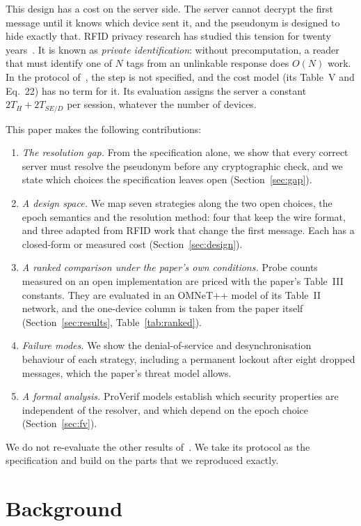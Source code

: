 This design has a cost on the server side. The server cannot decrypt the first message until it knows which device sent
it, and the pseudonym is designed to hide exactly that. RFID privacy research has studied this tension for twenty
years~\cite{weis,ohkubo,molnar,avoine05,ado05,tsudik}. It is known as \emph{private identification}: without
precomputation, a reader that must identify one of $N$ tags from an unlinkable response does $O(N)$ work. In the protocol
of~\cite{base}, the step is not specified, and the cost model (its Table~V and Eq.~22) has no term for it. Its evaluation
assigns the server a constant $2T_H+2T_{SE/D}$ per session, whatever the number of devices.

This paper makes the following contributions:
\begin{enumerate}
\item \emph{The resolution gap.} From the specification alone, we show that every correct server must resolve the
pseudonym before any cryptographic check, and we state which choices the specification leaves open
(Section~\ref{sec:gap}).
\item \emph{A design space.} We map seven strategies along the two open choices, the epoch semantics and the resolution
method: four that keep the wire format, and three adapted from RFID work that change the first message. Each has a
closed-form or measured cost (Section~\ref{sec:design}).
\item \emph{A ranked comparison under the paper's own conditions.} Probe counts measured on an open implementation are
priced with the paper's Table~III constants. They are evaluated in an OMNeT++ model of its Table~II network, and the
one-device column is taken from the paper itself (Section~\ref{sec:results}, Table~\ref{tab:ranked}).
\item \emph{Failure modes.} We show the denial-of-service and desynchronisation behaviour of each strategy, including a
permanent lockout after eight dropped messages, which the paper's threat model allows.
\iffv
\item \emph{A formal analysis.} ProVerif models establish which security properties are independent of the resolver,
and which depend on the epoch choice (Section~\ref{sec:fv}).
\fi
\end{enumerate}
We do not re-evaluate the other results of~\cite{base}. We take its protocol as the specification and build on the parts
that we reproduced exactly.

\section{Background}\label{sec:background}
